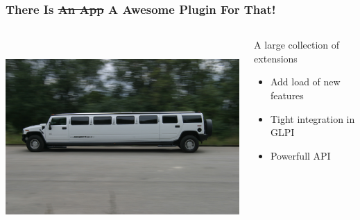 \documentclass{beamer}
\begin{document}
\begin{frame}

    \frametitle{\textbf{There Is \sout{An App} A Awesome Plugin For That!}}

 \begin{columns}
 \begin{column}{0.45\textwidth}
         \includegraphics[height=7.5cm]{./pics/plugin.jpg}
 \end{column}
 \begin{column}{0.65\textwidth}
    \begin{block}{A large collection of \\
    extensions}
        \begin{itemize}
            \item Add load of new features
            \item Tight integration in GLPI
            \item Powerfull API
        \end{itemize}
    \end{block}

 \end{column}
\end{columns}

\end{frame}
\end{document}
